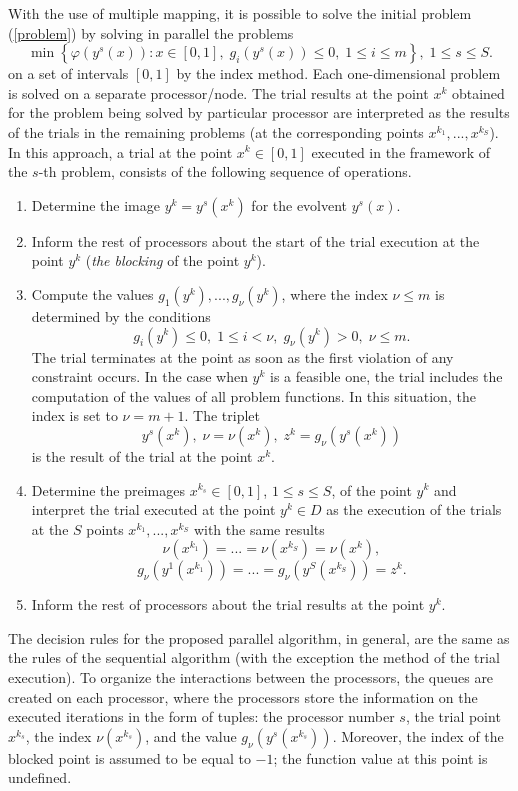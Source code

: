 \documentclass[smallextended]{svjour3}       %
\begin{document}
With the use of multiple mapping, it is possible to solve the initial problem (\ref{problem}) by solving in parallel the problems
\[
\min \left\{\varphi(y^s(x)): x \in [0,1], \; g_i(y^s(x))\leq 0, \; 1 \leq i \leq m\right\},\; 1\leq s \leq S.
\]
on a set of intervals $[0,1]$ by the index method. Each one-dimensional problem is solved on a separate processor/node. The trial results at the point $x^k$ obtained for the problem being solved by particular processor are interpreted as the results of the trials in the remaining problems (at the corresponding points $x^{k_1},...,x^{k_S}$). In this approach, a trial at the point $x^k \in [0,1]$ executed in the framework of the $s$-th problem, consists of the following sequence of operations.

\begin{enumerate}
	
	\item Determine the image $y^k=y^s(x^k)$ for the evolvent $y^s(x)$.
	
	\item Inform the rest of processors about the start of the trial execution at the point $y^k$ (\textit{the blocking} of the point $y^k$).
	
	\item Compute the values $g_1(y^k),...,g_\nu(y^k)$, where the index $\nu \leq m$ is determined by the conditions
	\[
		g_i(y^k)\leq 0, \; 1 \leq i < \nu, \; g_\nu(y^k)>0, \; \nu \leq m.
	\]
The trial terminates at the point as soon as the first violation of any constraint occurs. In the case when $y^k$ is a feasible one, the trial includes the computation of the values of all problem functions. In this situation, the index is set to $\nu=m+1$. The triplet
\[
y^s(x^k), \; \nu=\nu(x^k), \; z^k=g_\nu(y^s(x^k))
\]
is the result of the trial at the point $x^k$.

\item Determine the preimages $x^{k_s} \in [0,1]$, $1 \leq s \leq S$, of the point $y^k$ and interpret the trial executed at the point $y^k \in D$ as the execution of the trials at the $S$ points  $x^{k_1},...,x^{k_S}$ with the same results
\[
 \nu(x^{k_1}) = ... = \nu(x^{k_S}) = \nu(x^k),
\]
\[
 g_\nu(y^1(x^{k_1})) = ... = g_\nu(y^S(x^{k_S})) = z^k.
\]

\item Inform the rest of processors about the trial results at the point $y^k$.
	
\end{enumerate}

The decision rules for the proposed parallel algorithm, in general, are the same as the rules of the sequential algorithm (with the exception the method of the trial execution). To organize the interactions between the processors, the queues are created on each processor, where the processors store the information on the executed iterations in the form of tuples: the processor number $s$, the trial point $x^{k_s}$, the index $\nu(x^{k_s})$, and the value $g_\nu(y^s (x^{k_s} ) )$. Moreover, the index of the blocked point is assumed to be equal to $-1$; the function value at this point is undefined.
\end{document}
